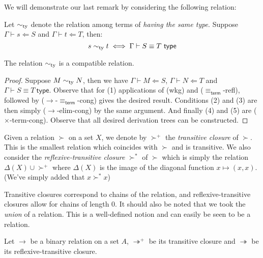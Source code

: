 We will demonstrate our last remark by considering the following relation:

\begin{defin}
    Let $\sim_{\mathrm{ty}}$ denote the relation among terms of \emph{having the same type}. Suppose $\Gamma \vdash s \Leftarrow S$ and $\Gamma \vdash t \Leftarrow T$, then:
    $$
        s \sim_{\mathrm{ty}} t \iff \Gamma \vdash S \equiv T \ \mathsf{type}
    $$
\end{defin}

\begin{lemma}
    The relation $\sim_{\mathrm{ty}}$ is a compatible relation.
\end{lemma}

\begin{proof}
    Suppose $M \sim_{\mathrm{ty}} N$, then we have $\Gamma \vdash M \Leftarrow S$, $\Gamma \vdash N \Leftarrow T$ and $\Gamma \vdash S \equiv T \ \mathsf{type}$.
    Observe that for (1) applications of (wkg) and ($\equiv_{\mathsf{term}}$-refl), followed by ($\to$-$\equiv_{\mathsf{term}}$-cong) gives the desired result. Conditions (2) and (3) are then simply ($\to$-elim-cong) by the same argument. And finally (4) and (5) are ($\times$-term-cong). Observe that all desired derivation trees can be constructed.
\end{proof}

\begin{defin}
    Given a relation $\succ$ on a set $X$, we denote by $\succ^+$ the \emph{transitive closure} of $\succ$. This is the smallest relation which coincides with $\succ$ and is transitive. We also consider the \emph{reflexive-transitive closure} $\succ^*$ of $\succ$ which is simply the relation $\Delta(X)\cup \succ^+ $ where $\Delta(X)$ is the image of the diagonal function $x \mapsto (x,x)$. (We've simply added that $x \succ^* x$)
\end{defin}

\begin{remark}
    Transitive closures correspond to chains of the relation, and reflexive-transitive closures allow for chains of length $0$. It should also be noted that we took the \emph{union} of a relation. This is a well-defined notion and can easily be seen to be a relation.
\end{remark}

Let $\to$ be a binary relation on a set $A$, $\twoheadrightarrow^+$ be its transitive closure and $\twoheadrightarrow$ be its reflexive-transitive closure.

